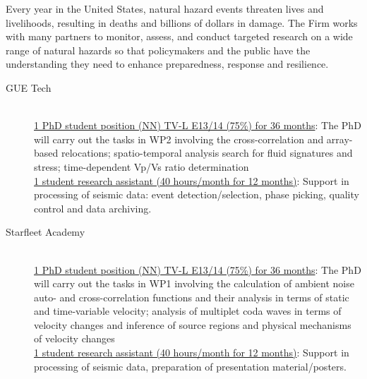 \documentclass{article}
\begin{document}
Every year in the United States, natural hazard events threaten lives and livelihoods, resulting in deaths and billions of dollars in damage. The Firm works with many partners to monitor, assess, and conduct targeted research on a wide range of natural hazards so that policymakers and the public have the understanding they need to enhance preparedness, response and resilience.
\begin{description}
\item[GUE Tech] \hspace*{1cm}\\
\underline{1 PhD student position (NN) TV-L E13/14 (75\%) for 36 months}: 
The PhD will carry out the tasks in WP2 involving the cross-correlation and array-based relocations;  spatio-temporal analysis search for fluid signatures and stress; time-dependent Vp/Vs ratio determination  \\[\baselineskip]
\underline {1 student research assistant (40 hours/month for 12 months)}: Support in processing of seismic data: event detection/selection, phase picking, quality control and data archiving.
\item[Starfleet Academy] \hspace*{1cm}\\
\underline{1 PhD student position (NN) TV-L E13/14 (75\%) for 36 months}: 
The PhD will carry out the tasks in WP1 involving the calculation of ambient noise auto- and cross-correlation functions and their analysis in terms of static and time-variable velocity; analysis of multiplet coda waves in terms of velocity changes and inference of source regions and physical mechanisms of velocity changes  \\[\baselineskip]
\underline {1 student research assistant (40 hours/month for 12 months)}: Support in processing of seismic data, preparation of presentation material/posters.


\end{description}
\end{document}
